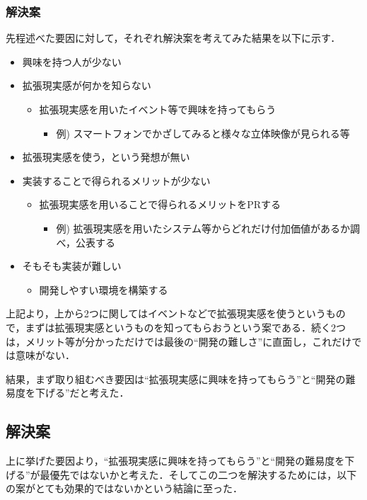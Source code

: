\subsubsection{解決案}
先程述べた要因に対して，それぞれ解決案を考えてみた結果を以下に示す．
\begin{itemize}
 \item 興味を持つ人が少ない
 \item 拡張現実感が何かを知らない
       \begin{itemize}
	\item 拡張現実感を用いたイベント等で興味を持ってもらう
	      \begin{itemize}
	       \item 例) スマートフォンでかざしてみると様々な立体映像が見られる等
	      \end{itemize}
       \end{itemize}
       \vspace{10pt}
 \item 拡張現実感を使う，という発想が無い
 \item 実装することで得られるメリットが少ない
       \begin{itemize}
	\item 拡張現実感を用いることで得られるメリットをPRする
	      \begin{itemize}
	       \item 例) 拡張現実感を用いたシステム等からどれだけ付加価値があるか調べ，公表する
	      \end{itemize}
       \end{itemize}
 \item そもそも実装が難しい
       \begin{itemize}
	\item 開発しやすい環境を構築する
       \end{itemize}
\end{itemize}

\newpage
上記より，上から2つに関してはイベントなどで拡張現実感を使うというもので，まずは拡張現実感というものを知ってもらおうという案である．続く2つは，メリット等が分かっただけでは最後の``開発の難しさ''に直面し，これだけでは意味がない．
\par \vspace{5pt}
結果，まず取り組むべき要因は``拡張現実感に興味を持ってもらう''と``開発の難易度を下げる''だと考えた．

\subsection{解決案}
上に挙げた要因より，``拡張現実感に興味を持ってもらう''と``開発の難易度を下げる''が最優先ではないかと考えた．そしてこの二つを解決するためには，以下の案がとても効果的ではないかという結論に至った．\par

